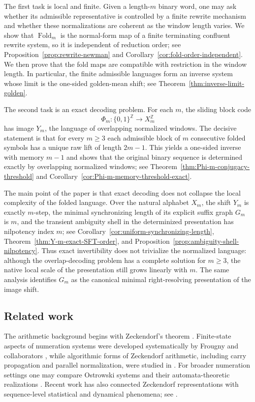 \documentclass[11pt,letterpaper]{article}
\numberwithin{equation}{section}
\theoremstyle{plain}
\theoremstyle{definition}
\theoremstyle{remark}
\newcommand{\ZZ}{\mathbb{Z}}
\DeclareMathOperator{\Fold}{Fold}
\begin{document}
The first task is local and finite.  Given a length-$m$ binary word, one may
ask whether its admissible representative is controlled by a finite rewrite
mechanism and whether these normalizations are coherent as the window length
varies.  We show that $\Fold_m$ is the normal-form map of a finite terminating
confluent rewrite system, so it is independent of reduction order; see
Proposition~\ref{prop:rewrite-newman} and
Corollary~\ref{cor:fold-order-independent}.  We then prove that the fold maps
are compatible with restriction in the window length.  In particular, the
finite admissible languages form an inverse system whose limit is the one-sided
golden-mean shift; see Theorem~\ref{thm:inverse-limit-golden}.

The second task is an exact decoding problem.  For each $m$, the
sliding block code
\[
\Phi_m:\{0,1\}^{\ZZ}\to X_m^{\ZZ}
\]
has image $Y_m$, the language of overlapping normalized windows.  The decisive
statement is that for every $m\ge 3$ each admissible block of $m$ consecutive
folded symbols has a unique raw lift of length $2m-1$.  This yields a one-sided
inverse with memory $m-1$ and shows that the original binary sequence is
determined exactly by overlapping normalized windows; see
Theorem~\ref{thm:Phi-m-conjugacy-threshold} and
Corollary~\ref{cor:Phi-m-memory-threshold-exact}.

The main point of the paper is that exact decoding does not collapse the local
complexity of the folded language.  Over the natural alphabet $X_m$, the shift
$Y_m$ is exactly $m$-step, the minimal synchronizing length of its explicit
suffix graph $G_m$ is $m$, and the transient ambiguity shell in the
determinized presentation has nilpotency index $m$; see
Corollary~\ref{cor:uniform-synchronizing-length},
Theorem~\ref{thm:Y-m-exact-SFT-order}, and
Proposition~\ref{prop:ambiguity-shell-nilpotency}.  Thus exact invertibility
does not trivialize the normalized language: although the overlap-decoding
problem has a complete solution for $m\ge 3$, the native local scale of the
presentation still grows linearly with $m$.  The same analysis identifies
$G_m$ as the canonical minimal right-resolving presentation of the image shift.

\subsection*{Related work}

The arithmetic background begins with Zeckendorf's theorem
\cite{Zeckendorf1972}.  Finite-state aspects of numeration systems were
developed systematically by Frougny and collaborators
\cite{Frougny1992NumbersAutomata,Frougny1999OnlineAddition,
FrougnySolomyak1992}, while algorithmic forms of Zeckendorf arithmetic,
including carry propagation and parallel normalization, were studied in
\cite{AhlbachUsatineFrougnyPippenger2013}.  For broader numeration settings one
may compare Ostrowski systems and their automata-theoretic realizations
\cite{Berthe2001Ostrowski,HieronymiTerry2018OstrowskiAddition,
BaranwalaSchaefferShallit2021OstrowskiAutomatic}.  Recent work has also
connected Zeckendorf representations with sequence-level statistical and
dynamical phenomena; see \cite{ManiboMiroRustTadeo2020ZeckendorfMixing}.
\end{document}
